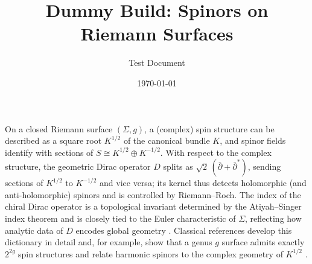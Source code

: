 \documentclass[11pt,a4paper]{article}
\title{Dummy Build: Spinors on Riemann Surfaces}
\author{Test Document}
\date{\today}
\begin{document}
\maketitle

On a closed Riemann surface $(\Sigma,g)$, a (complex) spin structure can be described as a square root $K^{1/2}$ of the canonical bundle $K$, and spinor fields identify with sections of $S \cong K^{1/2} \oplus K^{-1/2}$. With respect to the complex structure, the geometric Dirac operator $D$ splits as $\sqrt{2}\,(\bar\partial + \bar\partial^{\!*})$, sending sections of $K^{1/2}$ to $K^{-1/2}$ and vice versa; its kernel thus detects holomorphic (and anti-holomorphic) spinors and is controlled by Riemann–Roch. The index of the chiral Dirac operator is a topological invariant determined by the Atiyah–Singer index theorem and is closely tied to the Euler characteristic of $\Sigma$, reflecting how analytic data of $D$ encodes global geometry \parencite{atiyah-singer-1968,friedrich-2000}. Classical references develop this dictionary in detail and, for example, show that a genus $g$ surface admits exactly $2^{2g}$ spin structures and relate harmonic spinors to the complex geometry of $K^{1/2}$ \parencite{lawson-michelsohn-1989}.

\printbibliography
\end{document}
